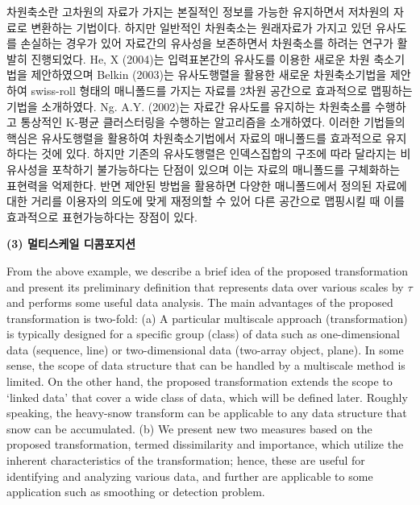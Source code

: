 \documentclass[preprint, review, 12pt]{article}
\theoremstyle{definition}
\theoremstyle{remark}
\begin{document}
차원축소란 고차원의 자료가 가지는 본질적인 정보를 가능한 유지하면서 저차원의 자료로 변환하는 기법이다. 하지만 일반적인 차원축소는 원래자료가 가지고 있던 유사도를 손실하는 경우가 있어 자료간의 유사성을 보존하면서 차원축소를 하려는 연구가 활발히 진행되었다. He, X (2004)는 입력표본간의 유사도를 이용한 새로운 차원 축소기법을 제안하였으며 Belkin (2003)는 유사도행렬을 활용한 새로운 차원축소기법을 제안하여 swiss-roll 형태의 매니폴드를 가지는 자료를 2차원 공간으로 효과적으로 맵핑하는 기법을 소개하였다. Ng. A.Y. (2002)는 자료간 유사도를 유지하는 차원축소를 수행하고 통상적인 K-평균 클러스터링을 수행하는 알고리즘을 소개하였다. 이러한 기법들의 핵심은 유사도행렬을 활용하여 차원축소기법에서 자료의 매니폴드를 효과적으로 유지하다는 것에 있다. 하지만 기존의 유사도행렬은 인덱스집합의 구조에 따라 달라지는 비유사성을 포착하기 불가능하다는 단점이 있으며 이는 자료의 매니폴드를 구체화하는 표현력을 억제한다. 반면 제안된 방법을 활용하면 다양한 매니폴드에서 정의된 자료에 대한 거리를 이용자의 의도에 맞게 재정의할 수 있어 다른 공간으로 맵핑시킬 때 이를 효과적으로 표현가능하다는 장점이 있다.

\noindent\textbf{(3) 멀티스케일 디콤포지션} 

From the above example, we describe a brief idea of the proposed transformation and present its preliminary definition that represents data over various scales by $\tau$ and performs some useful data analysis. The main advantages of the proposed transformation is two-fold: (a)  A particular multiscale approach (transformation) is typically designed for a specific group (class) of data such as one-dimensional data (sequence, line) or two-dimensional data (two-array object, plane). In some sense, the scope of data structure that can be handled by a multiscale method is limited. On the other hand, the proposed transformation extends the scope to `linked data' that cover a wide class of data, which will be defined later. Roughly speaking, the heavy-snow transform can be applicable to any data structure that snow can be accumulated. (b) We present new two measures based on the proposed transformation, termed dissimilarity and importance, which utilize the inherent characteristics of the transformation; hence, these are useful for identifying and analyzing various data, and  further are applicable to some application such as smoothing or detection problem.   
\end{document}
